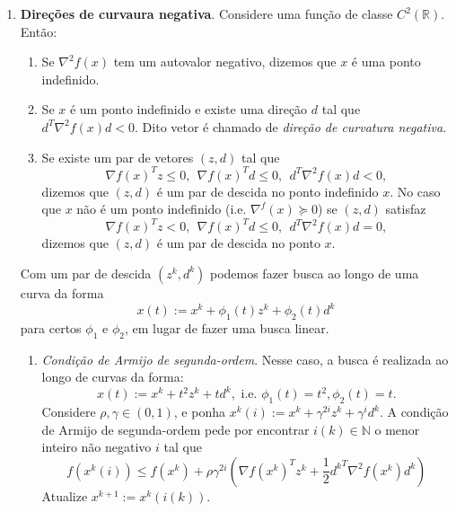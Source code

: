 \documentclass[a4paper,latin]{article}
\begin{document}
\begin{enumerate}
    (iii) Use o resultado anterior para provar que a sequência $x^{k}$ generada pelo método de máxima descida (com busca exata)  
      aplicado ao problema 
      $\min f(x):=(1/2)x^{T}Ax$ converge à solução $x^*$ de dito problema e 
     $$ \frac{\|x^{k+1}-x^*\|}{\|x^k-x^*\|}\leq \sqrt{\mathcal{K}} \left(\frac{\mathcal{K}-1}{\mathcal{K}+1}\right), \text{ onde } \mathcal{K}=\frac{\lambda_{min}(A)}{\lambda_{max}(A)}. $$ 
   \item {\bf Direções de curvaura negativa}. Considere uma função de classe $C^{2}(\mathbb{R})$. Então:
      \begin{enumerate}
      \item Se $\nabla^{2} f(x)$ tem um autovalor negativo, dizemos que $x$ é uma ponto indefinido.
      \item Se $x$ é um ponto indefinido e 
      existe uma direção $d$ 
      tal que $d^{T}\nabla^{2}f(x)d<0$.
      Dito vetor é chamado de 
      {\it direção de curvatura negativa}.
      \item Se existe um par de 
      vetores $(z,d)$ tal que
      $$ 
         \nabla f(x)^{T}z \leq 0, \ \ 
         \nabla f(x)^{T}d \leq 0, \ \
         d^{T}\nabla^{2}f(x)d<0, 
      $$ 
      dizemos que $(z,d)$ é um par de descida no ponto indefinido $x$.
      No caso que $x$ não é um ponto indefinido (i.e. 
      $\nabla^{f}(x) \succeq 0$)
      se  $(z,d)$ satisfaz
       $$ 
         \nabla f(x)^{T}z < 0, \ \ 
         \nabla f(x)^{T}d \leq 0, \ \
         d^{T}\nabla^{2}f(x)d=0, 
      $$ 
      dizemos que $(z,d)$ é um par de descida no ponto $x$.     
      \end{enumerate}
   Com um par de descida $(z^k,d^k)$ podemos fazer busca ao longo de uma curva da forma 
   $$ x(t):=x^{k}+
   \phi_1(t)z^{k}+\phi_{2}(t)d^{k}$$
   para certos $\phi_{1}$ e $\phi_2$, em lugar de fazer uma busca linear.
     \begin{enumerate}
     \item {\it Condição de Armijo de segunda-ordem}. Nesse caso, a busca é realizada ao longo de curvas da forma:
     $$ x(t):=x^{k}+
   t^2z^{k}+t d^{k}, \text{ i.e. } \phi_{1}(t)=t^{2}, \phi_{2}(t)=t. $$
   Considere $\rho, \gamma \in (0,1)$, 
   e ponha 
   $x^{k}(i):=x^{k}+
   \gamma^{2i}z^{k}+\gamma^{i}d^{k}$.
  A condição de Armijo de segunda-ordem 
  pede por encontrar $i(k)\in \mathbb{N}$
  o menor inteiro não negativo $i$ tal que 
     $$ f(x^{k}(i))\leq 
     f(x^k)+
     \rho\gamma^{2i}
     (\nabla f(x^k)^{T}z^k+\frac{1}{2}{d^{k}}^{T}\nabla^{2}f(x^k)d^k)
     $$
     Atualize $x^{k+1}:=x^{k}(i(k))$.

\end{enumerate}
\end{enumerate}
\end{document}
